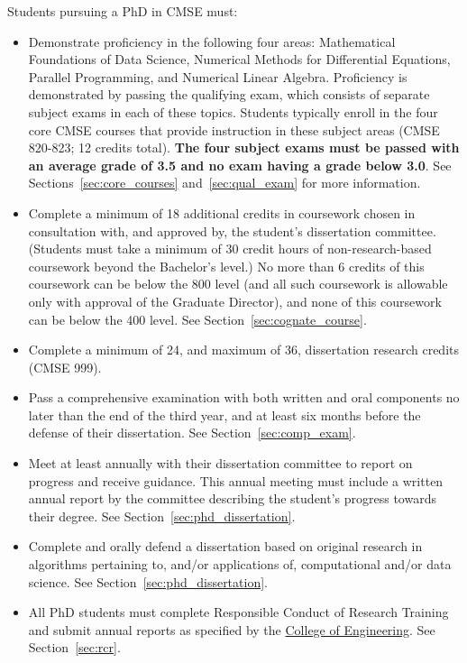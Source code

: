 Students pursuing a PhD in CMSE must:

\begin{itemize}
\item  Demonstrate proficiency in the following four areas:
  Mathematical Foundations of Data Science, Numerical Methods for
  Differential Equations, Parallel Programming, and Numerical Linear
  Algebra.  Proficiency is demonstrated by passing the qualifying
  exam, which consists of separate subject exams in each of these
  topics.  Students typically enroll in the four core CMSE courses
  that provide instruction in these subject areas (CMSE 820-823; 12
  credits total).  \textbf{The four subject exams must be passed with an
  average grade of 3.5 and no exam having a grade below 3.0}.  See
Sections~\ref{sec:core_courses} and~\ref{sec:qual_exam} for more information.

\item Complete a minimum of 18 additional credits in coursework
  chosen in consultation with, and approved by, the student's
  dissertation committee.  (Students must take a minimum of 30 credit
  hours of non-research-based coursework beyond the Bachelor's level.)
  No more than 6 credits of this coursework can be below the 800 level
  (and all such coursework is allowable only with approval of the
  Graduate Director), and none of this coursework can be below the 400
  level.  See Section~\ref{sec:cognate_course}.

\item Complete a minimum of 24, and maximum of 36, dissertation
  research credits (CMSE 999).

\item Pass a comprehensive examination with both written and oral
  components no later than the end of the third year, and at least six months before the defense of their
  dissertation.  See Section~\ref{sec:comp_exam}.

\item Meet at least annually with their dissertation committee to report on
  progress and receive guidance.  This annual meeting must include a
  written annual report by the committee describing the student's
  progress towards their degree.   See Section~\ref{sec:phd_dissertation}.

\item Complete and orally defend a dissertation based on original
  research in algorithms pertaining to, and/or applications of,
  computational and/or data science.  See Section~\ref{sec:phd_dissertation}.

\item All PhD students must complete Responsible Conduct of Research
  Training and submit annual reports as specified by the
  \href{https://www.egr.msu.edu/academics/graduate/rcr}{College of
    Engineering}.  See Section~\ref{sec:rcr}.

\end{itemize}

